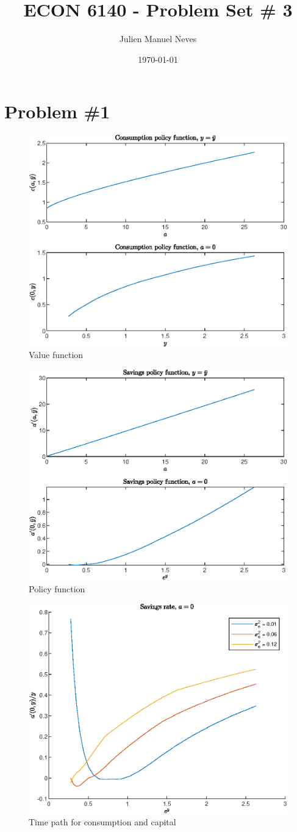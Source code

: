 \documentclass[12pt]{article}
\title{ECON 6140 - Problem Set \# 3}
\date{\today}
\author{Julien Manuel Neves}
\newcommand{\1}{{\bf 1}} %
\begin{document}
\maketitle

\section*{Problem \#1}

	\begin{figure}[H]
		\centering
		\includegraphics[width=0.7\linewidth]{fig1}
		\caption{Value function}
		\label{fig:fig1}
	\end{figure}
	\begin{figure}[H]
		\centering
		\includegraphics[width=0.7\linewidth]{fig2}
		\caption{Policy function}
		\label{fig:fig2}
	\end{figure}

	\begin{figure}[H]
		\centering
		\includegraphics[width=0.7\linewidth]{fig3}
		\caption{Time path for consumption and capital}
		\label{fig:fig3}
	\end{figure}
\end{document}

